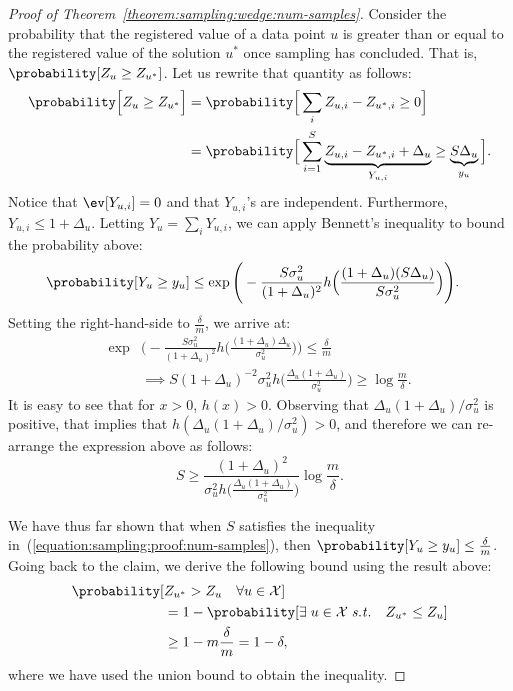 \begin{proof}[Proof of Theorem~\ref{theorem:sampling:wedge:num-samples}]
    Consider the probability that the registered value of a data point $u$
    is greater than or equal to the registered value of the solution $u^\ast$
    once sampling has concluded. That is, $\probability[Z_u \geq Z_{u^\ast}]$.
    Let us rewrite that quantity as follows:
    \begin{align*}
        \probability\Big[Z_u \geq Z_{u^\ast} \Big] &= 
            \probability \Big[\sum_i Z_{u,i} - Z_{{u^\ast},i} \geq 0 \Big] \\
        &= \probability\Big[ \sum_{i=1}^S \underbrace{Z_{u,i} - Z_{{u^\ast},i} + \Delta_u}_{Y_{u,i}} \geq \underbrace{S\Delta_u}_{y_u} \Big].
    \end{align*}
    Notice that $\ev[Y_{u,i}] = 0$ and that $Y_{u,i}$'s are independent.
    Furthermore, $Y_{u,i} \leq 1 + \Delta_u$. Letting $Y_u = \sum_i Y_{u,i}$,
    we can apply Bennett's inequality to bound the probability above:
    \begin{align*}
        \probability[ Y_u \geq y_u] &\leq \exp\Bigg(
            -\frac{S \sigma^2_u}{(1 + \Delta_u)^2}
            h\Big( \frac{(1 + \Delta_u) (S \Delta_u)}{S \sigma^2_u} \Big)
        \Bigg).
    \end{align*}
    Setting the right-hand-side to $\frac{\delta}{m}$, we arrive at:
    \begin{align*}
        \exp&\Bigg(
            -\frac{S \sigma^2_u}{(1 + \Delta_u)^2}
            h\Big( \frac{(1 + \Delta_u) \Delta_u}{\sigma^2_u} \Big)
        \Bigg) \leq \frac{\delta}{m} \\
        &\implies
        S (1 + \Delta_u)^{-2} \sigma^2_u h\Big( \frac{\Delta_u(1 + \Delta_u)}{\sigma^2_u} \Big)
        \geq \log \frac{m}{\delta}.
    \end{align*}
    It is easy to see that for $x > 0$, $h(x) > 0$. Observing that $\Delta_u(1 + \Delta_u)/\sigma^2_u$
    is positive, that implies that $h(\Delta_u(1 + \Delta_u) / \sigma^2_u) > 0$,
    and therefore we can re-arrange the expression above as follows:
    \begin{equation}
        \label{equation:sampling:proof:num-samples}
        S \geq \frac{(1+ \Delta_u)^2}{\sigma^2_u h\Big( \frac{\Delta_u (1 + \Delta_u)}{\sigma^2_u} \Big)} \log \frac{m}{\delta}.
    \end{equation}

    We have thus far shown that when $S$ satisfies the
    inequality in~(\ref{equation:sampling:proof:num-samples}),
    then $\probability[Y_u \geq y_u] \leq \frac{\delta}{m}$.
    Going back to the claim, we derive the following bound using the result above:
    \begin{align*}
        \probability[ &Z_{u^\ast} > Z_u \quad \forall u \in \mathcal{X}] \\
        &= 1 - \probability[ \exists \; u \in \mathcal{X} \; \mathit{s.t.} \quad Z_{u^\ast} \leq Z_u] \\
        &\geq 1 - m \frac{\delta}{m} = 1 - \delta,
    \end{align*}
    where we have used the union bound to obtain the inequality.
\end{proof}

